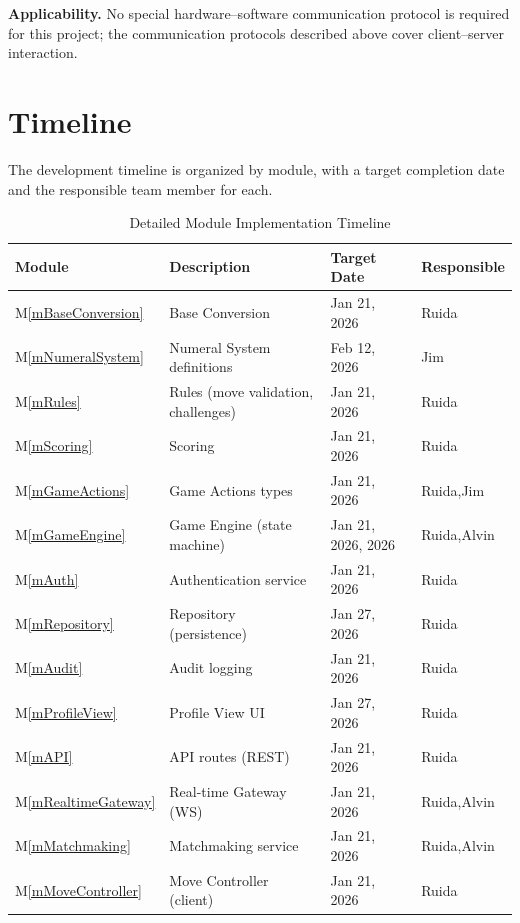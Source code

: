 \documentclass[12pt, titlepage]{article}
\newcommand{\mref}[1]{M\ref{#1}}
\begin{document}
\noindent \textbf{Applicability.}
No special hardware--software communication protocol is required for this project; the communication protocols described above cover client--server interaction.



\newpage
\section{Timeline}\label{SecTimeline}

The development timeline is organized by module, with a target completion date and the responsible team member for each.

\begin{table}[H]
\centering
\caption{Detailed Module Implementation Timeline}
\label{TblTimeline}
\begin{tabularx}{\textwidth}{p{1.5cm} p{5.5cm} p{3cm} X}
\toprule
\textbf{Module} & \textbf{Description} & \textbf{Target Date} & \textbf{Responsible} \\
\midrule
\mref{mBaseConversion} & Base Conversion & Jan 21, 2026 & Ruida \\
\mref{mNumeralSystem} & Numeral System definitions & Feb 12, 2026 & Jim \\
\mref{mRules} & Rules (move validation, challenges) & Jan 21, 2026 & Ruida \\
\mref{mScoring} & Scoring & Jan 21, 2026 & Ruida \\
\mref{mGameActions} & Game Actions types & Jan 21, 2026 & Ruida,Jim \\
\mref{mGameEngine} & Game Engine (state machine) & Jan 21, 2026, 2026 & Ruida,Alvin \\
\midrule
\mref{mAuth} & Authentication service & Jan 21, 2026 & Ruida \\
\mref{mRepository} & Repository (persistence) & Jan 27, 2026 & Ruida \\
\mref{mAudit} & Audit logging & Jan 21, 2026 & Ruida \\
\mref{mProfileView} & Profile View UI & Jan 27, 2026 & Ruida \\
\midrule
\mref{mAPI} & API routes (REST) & Jan 21, 2026 & Ruida \\
\mref{mRealtimeGateway} & Real-time Gateway (WS) & Jan 21, 2026 & Ruida,Alvin \\
\mref{mMatchmaking} & Matchmaking service & Jan 21, 2026 & Ruida,Alvin \\
\mref{mMoveController} & Move Controller (client) & Jan 21, 2026 & Ruida \\

\end{tabularx}
\end{table}
\end{document}
